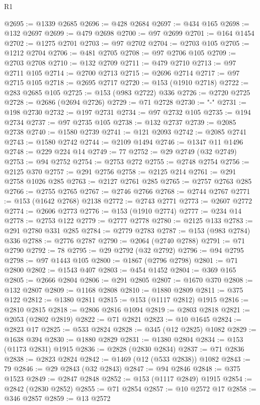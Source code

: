 \begin{lexlean}{R1}
\begin{coremodule}
@2695 := @1339 @2685
@2696 := @428 @2684
@2697 := @434 @165
@2698 := @132 @2697
@2699 := @479 @2698
@2700 := @97 @2699
@2701 := @164 @1454
@2702 := @1275 @2701
@2703 := @97 @2702
@2704 := @2703 @105
@2705 := @1212 @2704
@2706 := @481 @2705
@2708 := @97 @2706 @105
@2709 := @2703 @2708
@2710 := @132 @2709
@2711 := @479 @2710
@2713 := @97 @2711 @105
@2714 := @2700 @2713
@2715 := @2696 @2714
@2717 := @97 @2715 @105
@2718 := @2695 @2717
@2720 := @153 (@1910 @2718)
@2722 := @283 @2685 @105
@2725 := @153 (@983 @2722) @336
@2726 := @2720 @2725
@2728 := @2686 (@2694 @2726)
@2729 := @71 @2728
@2730 := "-"
@2731 := @198 @2730
@2732 := @197 @2731
@2734 := @97 @2732 @105
@2735 := @194 @2734
@2737 := @97 @2735 @105
@2738 := @132 @2737
@2739 := @2085 @2738
@2740 := @1580 @2739
@2741 := @121 @2093
@2742 := @2085 @2741
@2743 := @1580 @2742
@2744 := @2109 @1494
@2746 := @1347 @11 @1496
@2748 := @229 @224 @14
@2749 := 77
@2752 := @29 @2749 (@32 @2749)
@2753 := @94 @2752
@2754 := @2753 @272
@2755 := @2748 @2754
@2756 := @2125 @370
@2757 := @291 @2756
@2758 := @2125 @214
@2761 := @291 @2758 @1026 @285
@2763 := @2127 @2761 @285
@2765 := @2757 @2763 @285
@2766 := @2755 @2765
@2767 := @2746 @2766
@2768 := @2744 @2767
@2771 := @153 (@1642 @2768) @2138
@2772 := @2743 @2771
@2773 := @2607 @2772
@2774 := @2606 @2773
@2776 := @153 (@1910 @2774)
@2777 := @234 @14
@2778 := @2753 @122
@2779 := @2777 @2778
@2780 := @2125 @133
@2783 := @291 @2780 @331 @285
@2784 := @2779 @2783
@2787 := @153 (@983 @2784) @336
@2788 := @2776 @2787
@2790 := @2064 (@2740 @2788)
@2791 := @71 @2790
@2792 := 78
@2795 := @29 @2792 (@32 @2792)
@2796 := @94 @2795
@2798 := @97 @1443 @105
@2800 := @1867 (@2796 @2798)
@2801 := @71 @2800
@2802 := @1543 @407
@2803 := @454 @1452
@2804 := @369 @165
@2805 := @2666 @2804
@2806 := @291 @2805
@2807 := @1670 @370
@2808 := @132 @2807
@2809 := @1168 @2808
@2810 := @1880 @2809
@2811 := @375 @122
@2812 := @1380 @2811
@2815 := @153 (@1117 @2812) @1915
@2816 := @2810 @2815
@2818 := @2806 @2816 @1094
@2819 := @2803 @2818
@2821 := @2053 (@2802 @2819)
@2822 := @71 @2821
@2823 := @10 @1645
@2824 := @2823 @17
@2825 := @533 @2824
@2828 := @345 (@12 @2825) @1082
@2829 := @1638 @394
@2830 := @1880 @2829
@2831 := @1380 @2804
@2834 := @153 (@1173 @2831) @1915
@2836 := @2828 (@2830 @2834)
@2837 := @71 @2836
@2838 := @2823 @2824
@2842 := @1469 (@12 (@533 @2838)) @1082
@2843 := 79
@2846 := @29 @2843 (@32 @2843)
@2847 := @94 @2846
@2848 := @375 @1523
@2849 := @2847 @2848
@2852 := @153 (@1117 @2849) @1915
@2854 := @2842 (@2830 @2852)
@2855 := @71 @2854
@2857 := @10 @2572 @17
@2858 := @346 @2857
@2859 := @13 @2572

\end{coremodule}
\end{lexlean}
